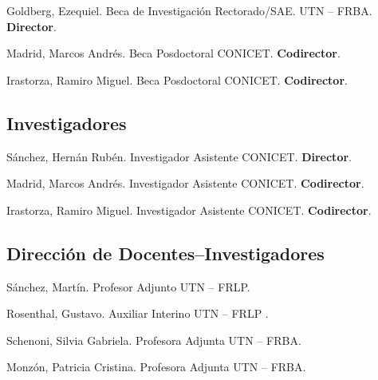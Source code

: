      Goldberg, Ezequiel. Beca de Investigación Rectorado/SAE. UTN -- FRBA. \textbf{Director}.

     Madrid, Marcos Andrés. Beca Posdoctoral CONICET. \textbf{Codirector}.

     Irastorza, Ramiro Miguel. Beca Posdoctoral CONICET. \textbf{Codirector}.

\subsection{Investigadores}
 Sánchez, Hernán Rubén. Investigador Asistente CONICET. \textbf{Director}.

     Madrid, Marcos Andrés. Investigador Asistente CONICET. \textbf{Codirector}.

     Irastorza, Ramiro Miguel. Investigador Asistente CONICET. \textbf{Codirector}.
  
\subsection{Dirección de Docentes--Investigadores}
   Sánchez, Martín. Profesor Adjunto UTN -- FRLP.
  
   Rosenthal, Gustavo. Auxiliar Interino UTN -- FRLP .
  
   Schenoni, Silvia Gabriela. Profesora Adjunta UTN -- FRBA.
  
   Monzón, Patricia Cristina. Profesora Adjunta UTN -- FRBA.
  

